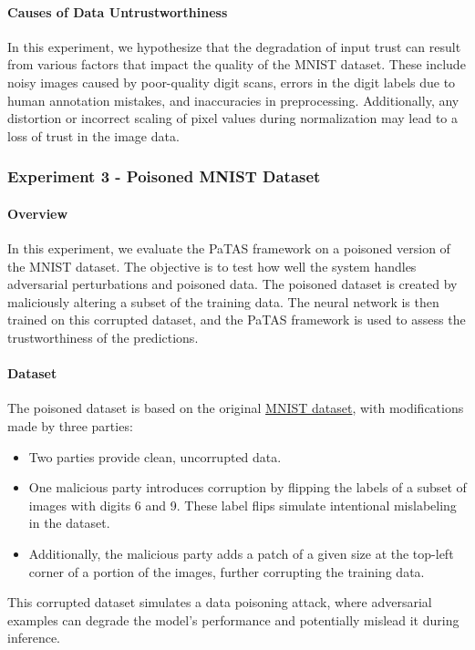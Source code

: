 \paragraph{Causes of Data Untrustworthiness}
In this experiment, we hypothesize that the degradation of input trust can result from various factors that impact the quality of the MNIST dataset. These include noisy images caused by poor-quality digit scans, errors in the digit labels due to human annotation mistakes, and inaccuracies in preprocessing. Additionally, any distortion or incorrect scaling of pixel values during normalization may lead to a loss of trust in the image data.


\subsubsection{Experiment 3 - Poisoned MNIST Dataset}

\paragraph{Overview}
In this experiment, we evaluate the PaTAS framework on a poisoned version of the MNIST dataset. The objective is to test how well the system handles adversarial perturbations and poisoned data. The poisoned dataset is created by maliciously altering a subset of the training data. The neural network is then trained on this corrupted dataset, and the PaTAS framework is used to assess the trustworthiness of the predictions.

\paragraph{Dataset}
The poisoned dataset is based on the original \href{http://yann.lecun.com/exdb/mnist/}{MNIST dataset}, with modifications made by three parties:
\begin{itemize}
    \item Two parties provide clean, uncorrupted data.
    \item One malicious party introduces corruption by flipping the labels of a subset of images with digits 6 and 9. These label flips simulate intentional mislabeling in the dataset.
    \item Additionally, the malicious party adds a patch of a given size at the top-left corner of a portion of the images, further corrupting the training data.
\end{itemize}
This corrupted dataset simulates a data poisoning attack, where adversarial examples can degrade the model's performance and potentially mislead it during inference.

